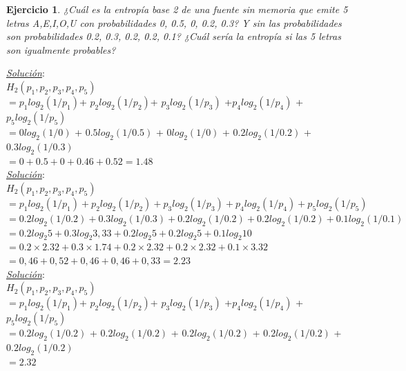 \documentclass{beamer}
\newtheorem{ejercicio} [Corolario]{Ejercicio}
\begin{document}
\begin{frame}  \small

\begin{ejercicio}

¿Cuál es la entropía base 2 de una fuente sin memoria que emite 5 letras A,E,I,O,U con probabilidades 0, 0.5, 0, 0.2, 0.3? Y sin las probabilidades son probabilidades 0.2, 0.3, 0.2, 0.2, 0.1? ¿Cuál sería la entropía si las 5 letras son igualmente probables?\\

\end{ejercicio}

\pause


\small	
\textit{\underline{Solución}}: \\
\tiny
$H_2(p_1, p_2, p_3,p_4,p_5)$\\
							    $= p_1 log_2(1/p_1) $+ $p_2 log_2(1/p_2) $+ $p_3 log_2(1/p_3)$ +$ p_4 log_2(1/p_4)$ +$ p_5 log_2(1/p_5) $\\
							    $= 0 log_2(1/0)$ + $0.5 log_2(1/0.5)$ + $0 log_2(1/0)$ + $0.2 log_2(1/0.2)$ + $0.3 log_2(1/0.3)$\\
								$= 0 + 0.5 + 0+ 0.46 + 0.52 = 1.48 $\\


\pause
\small	
\textit{\underline{Solución}}: \\

\tiny  
$H_2(p_1, p_2, p_3,p_4,p_5)$\\
							$  = p_1 log_2(1/p_1) + p_2 log_2(1/p_2) + p_3 log_2(1/p_3) + p_4 log_2(1/p_4) + p_5 log_2(1/p_5) $\\
							$  = 0.2 log_2(1/0.2) + 0.3 log_2(1/0.3) + 0.2 log_2(1/0.2) + 0.2 log_2(1/0.2) + 0.1 log_2(1/0.1)$\\
							$	= 0.2 log_2 5 + 0.3 log_2 3,33 + 0.2 log_2 5 + 0.2 log_2 5 + 0.1 log_2 10$\\
							$	= 0.2 \times 2.32 + 0.3 \times 1.74 + 0.2 \times 2.32 + 0.2 \times 2.32 + 0.1 \times 3.32$\\
							$	= 0,46 + 0,52 + 0,46 + 0,46 + 0,33 =2.23$\\

\pause
\small							
\textit{\underline{Solución}}: \\

\tiny
$H_2(p_1, p_2, p_3,p_4,p_5)$\\
							    $= p_1 log_2(1/p_1) $+ $p_2 log_2(1/p_2) $+ $p_3 log_2(1/p_3)$ +$ p_4 log_2(1/p_4)$ +$ p_5 log_2(1/p_5) $\\
							    $= 0.2 log_2(1/0.2)$ + $0.2 log_2(1/0.2)$ + $0.2 log_2(1/0.2)$ + $0.2 log_2(1/0.2)$ + $0.2 log_2(1/0.2)$\\
								$=  2.32$\\






\end{frame} 
\end{document}

